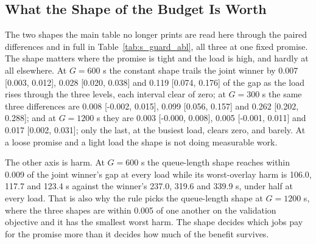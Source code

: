 \documentclass[mathematics,supfile,submit,moreauthors]{Definitions/mdpi}
\newcommand{\devnum}[1]{#1}
\begin{document}
\subsection{What the Shape of the Budget Is Worth}
\label{sec:supp_shape}

The two shapes the main table no longer prints are read here through the paired differences and
in full in Table~\ref{tab:s_guard_abl}, all three at one fixed promise. The
shape matters where the promise is tight and the load is high, and hardly at all elsewhere. At
$G = \devnum{600}$ s the constant shape trails the joint winner by
\devnum{0.007 [0.003, 0.012]}, \devnum{0.028 [0.020, 0.038]} and \devnum{0.119 [0.074, 0.176]}
of the gap as the load rises through the three levels, each interval clear of zero; at
$G = \devnum{300}$ s the same three differences are \devnum{0.008 [-0.002, 0.015]},
\devnum{0.099 [0.056, 0.157]} and \devnum{0.262 [0.202, 0.288]}; and at $G = \devnum{1200}$ s
they are \devnum{0.003 [-0.000, 0.008]}, \devnum{0.005 [-0.001, 0.011]} and
\devnum{0.017 [0.002, 0.031]}; only the last, at the busiest load, clears zero, and barely. At
a loose promise and a light load the shape is not doing measurable work.

The other axis is harm. At $G = \devnum{600}$ s the queue-length shape reaches within
\devnum{0.009} of the joint winner's gap at every load while its worst-overlay harm is
\devnum{106.0}, \devnum{117.7} and \devnum{123.4} s against the winner's \devnum{237.0},
\devnum{319.6} and \devnum{339.9} s, under half at every load. That is also why
the rule picks the queue-length shape at $G = \devnum{1200}$ s, where the three shapes are
within \devnum{0.005} of one another on the validation objective and it has the smallest worst
harm. The shape decides which jobs pay for the promise more than it decides how much of the
benefit survives.
\end{document}
